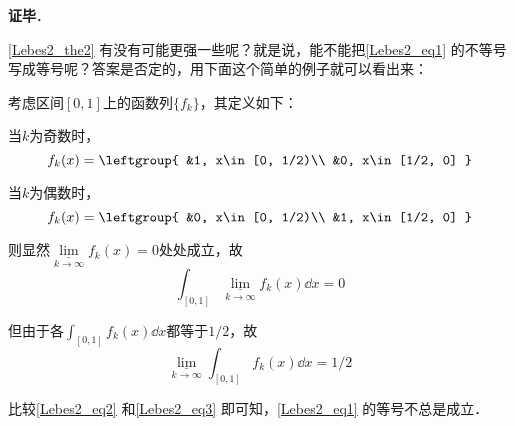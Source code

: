 \textbf{证毕}．

\autoref{Lebes2_the2} 有没有可能更强一些呢？就是说，能不能把\autoref{Lebes2_eq1} 的不等号写成等号呢？答案是否定的，用下面这个简单的例子就可以看出来：

\begin{example}{}
考虑区间$[0, 1]$上的函数列$\{f_k\}$，其定义如下：

当$k$为奇数时，
\begin{equation}
f_k(x)=\leftgroup{
    &1, x\in[0, 1/2)\\
    &0, x\in[1/2, 0]
}
\end{equation}

当$k$为偶数时，
\begin{equation}
f_k(x)=\leftgroup{
    &0, x\in[0, 1/2)\\
    &1, x\in[1/2, 0]
}
\end{equation}

则显然$\underline{\lim}\limits_{k\to \infty}f_k(x)=0$处处成立，故
\begin{equation}\label{Lebes2_eq2}
\int_{[0, 1]} \underline{\lim}\limits_{k\to \infty}f_k(x) \dd x = 0
\end{equation}

但由于各$\int_{[0, 1]} f_k(x) \dd x$都等于$1/2$，故
\begin{equation}\label{Lebes2_eq3}
\underline{\lim}\limits_{k\to \infty}\int_{[0, 1]} f_k(x) \dd x = 1/2
\end{equation}

比较\autoref{Lebes2_eq2} 和\autoref{Lebes2_eq3} 即可知，\autoref{Lebes2_eq1} 的等号不总是成立．

\end{example}








